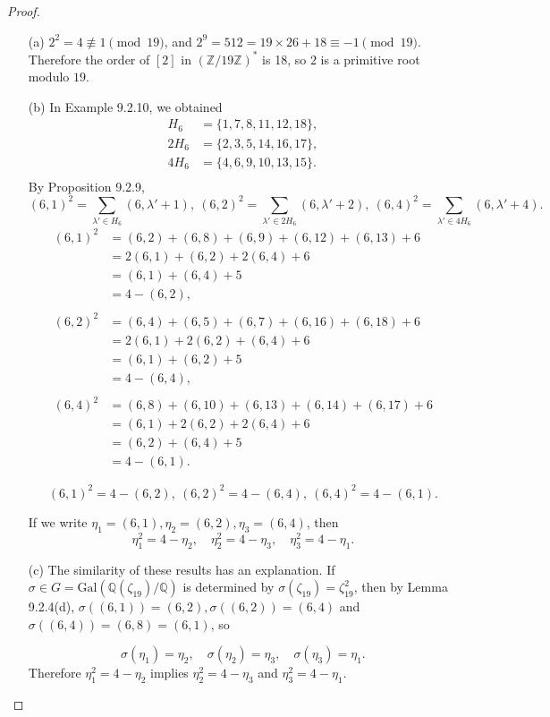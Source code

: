 \documentclass[11pt,a4paper]{article}
\newcommand{\Q}{\mathbb{Q}}
\newcommand{\Z}{\mathbb{Z}}
\newcommand{\Gal}{\mathrm{Gal}}
\begin{document}
\begin{proof}
\begin{enumerate}
\item[(a)]
$2^2=4\not \equiv 1\pmod {19}$, and $2^9=512 = 19\times26+18 \equiv -1\pmod{19}$. Therefore the order of $[2]$ in $(\Z/19\Z)^*$ is 1$8$, so $2$ is a primitive root modulo $19$.


\item[(b)]
In Example 9.2.10, we obtained
\begin{align*}
H_6 &= \{1,7,8,11,12,18\},\\
2H_6&=\{2,3,5,14,16,17\},\\
4H_6 &= \{4,6,9,10,13,15\}.\\
\end{align*}
By Proposition 9.2.9,
$$(6,1)^2 = \sum_{\lambda'\in H_6}(6,\lambda'+1),\ (6,2)^2 = \sum_{\lambda'\in 2H_6}(6,\lambda'+2),\ (6,4)^2 = \sum_{\lambda'\in 4H_6}(6,\lambda'+4).$$
\begin{align*}
(6,1)^2 &=(6,2)+(6,8)+(6,9)+(6,12)+(6,13)+6\\
&=2(6,1)+(6,2)+2(6,4)+6\\
&=(6,1)+(6,4)+5\\
&=4 - (6,2),\\
\\
(6,2)^2&=(6,4)+(6,5)+(6,7)+(6,16)+(6,18)+6\\
&=2(6,1)+2(6,2)+(6,4)+6\\
&=(6,1)+(6,2)+5\\
&=4-(6,4),\\
\\
(6,4)^2&=(6,8)+(6,10)+(6,13)+(6,14)+(6,17)+6\\
&=(6,1)+2(6,2)+2(6,4)+6\\
&=(6,2)+(6,4)+5\\
&=4-(6,1).
\end{align*}

$$(6,1)^2= 4 - (6,2),\ (6,2)^2 = 4-(6,4),\ (6,4)^2 = 4 - (6,1).$$

If we write $\eta_1= (6,1), \eta_2 = (6,2), \eta_3 = (6,4)$, then
$$\eta_1^2 = 4 - \eta_2,\quad \eta_2^2 = 4 - \eta_3, \quad \eta_3^2 = 4 - \eta_1.$$


\item[(c)]
The similarity of these results has an explanation. If $\sigma \in G=\Gal(\Q(\zeta_{19})/\Q)$ is determined by $\sigma(\zeta_{19}) = \zeta_{19}^2$, then by Lemma 9.2.4(d), 
$\sigma((6,1)) = (6,2), \sigma((6,2)) = (6,4)$ and $\sigma((6,4)) = (6,8) = (6,1)$, so

$$\sigma(\eta_1) = \eta_2,\quad  \sigma(\eta_2) = \eta_3,\quad  \sigma(\eta_3) = \eta_1.$$
Therefore $\eta_1^2 = 4 - \eta_2$ implies $\eta_2^2 = 4 - \eta_3$ and $\eta_3^2 = 4 - \eta_1$.


\end{enumerate}
\end{proof}
\end{document}
